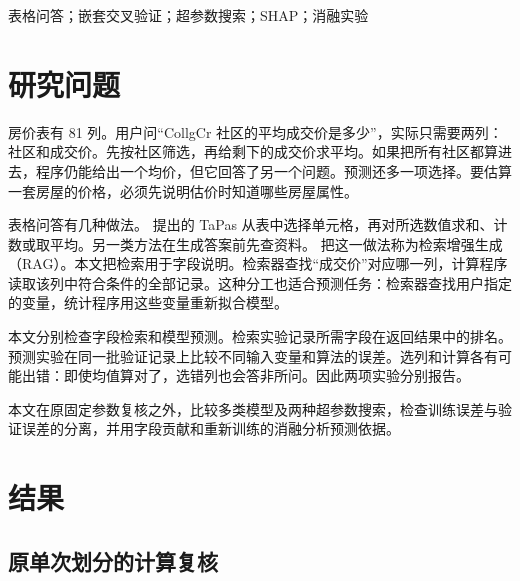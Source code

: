 \documentclass[12pt,journal,onecolumn,a4paper]{IEEEtran}
\begin{document}
\begin{abstract}
TableLab 在本地检索字段说明，通过 DeepSeek API 生成分析方案，再由本机程序完成统计与模型训练。本文用房价、收入分类、NBA 得分和学生成绩四个任务比较九种预设方法，并对森林与梯度提升分别进行网格和 TPE 搜索。外层三折评价训练流程，内层三折选择参数；训练与验证曲线检查拟合差距，SHAP 和重新调参的特征组消融检查模型依赖。房价的较小平均 RMSE 为 32,338.23 美元，来自提升树＋网格；收入分类中，提升树＋网格的 AUC 为 0.8913。NBA 得分由随机森林取得较小平均误差（5.698 分），学生成绩则是 Ridge（13.545 分）。各任务的较优方法与搜索收益不同，解释和消融结果也需结合字段之间的替代关系判断。
\end{abstract}
\renewcommand{\IEEEkeywordsname}{关键词}
\begin{IEEEkeywords}表格问答；嵌套交叉验证；超参数搜索；SHAP；消融实验\end{IEEEkeywords}
\clearpage\tableofcontents\clearpage
\section{研究问题}


房价表有 81 列。用户问“CollgCr 社区的平均成交价是多少”，实际只需要两列：社区和成交价。先按社区筛选，再给剩下的成交价求平均。如果把所有社区都算进去，程序仍能给出一个均价，但它回答了另一个问题。预测还多一项选择。要估算一套房屋的价格，必须先说明估价时知道哪些房屋属性。

表格问答有几种做法。\citet{herzig2020} 提出的 TaPas 从表中选择单元格，再对所选数值求和、计数或取平均。另一类方法在生成答案前先查资料。\citet{lewis2020} 把这一做法称为检索增强生成（RAG）。本文把检索用于字段说明。检索器查找“成交价”对应哪一列，计算程序读取该列中符合条件的全部记录。这种分工也适合预测任务：检索器查找用户指定的变量，统计程序用这些变量重新拟合模型。

本文分别检查字段检索和模型预测。检索实验记录所需字段在返回结果中的排名。预测实验在同一批验证记录上比较不同输入变量和算法的误差。选列和计算各有可能出错：即使均值算对了，选错列也会答非所问。因此两项实验分别报告。


本文在原固定参数复核之外，比较多类模型及两种超参数搜索，检查训练误差与验证误差的分离，并用字段贡献和重新训练的消融分析预测依据。
\section{结果}

\subsection{原单次划分的计算复核}
\end{document}
